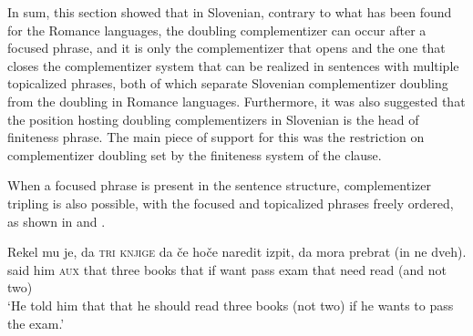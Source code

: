\documentclass[output=paper,
]{langscibook}
\begin{document}
\begin{exe} 
\ex \begin{xlist}\label{ex:plesnicar:42}

\end{xlist}
\end{exe}

\noindent In sum, this section showed that in Slovenian, contrary to what has been found for the Romance languages, the doubling complementizer can occur after a focused phrase, and it is only the complementizer that opens and the one that closes the complementizer system that can be realized in sentences with multiple topicalized phrases, both of which separate Slovenian complementizer doubling from the doubling in Romance languages. Furthermore, it was also suggested that the position hosting doubling complementizers in Slovenian is the head of finiteness phrase. The main piece of support for this was the restriction on complementizer doubling set by the finiteness system of the clause.

When a focused phrase is present in the sentence structure, complementizer tripling is also possible, with the focused and topicalized phrases freely ordered, as shown in  and .

\begin{exe} 
\ex \label{ex:plesnicar:43}
\gll Rekel	mu	je,	da	\textsc{tri} \textsc{knjige} da	če	hoče	naredit	izpit, da	mora 	prebrat (in ne dveh).\\
  said	him	\textsc{aux} that	three books	that	if	want	pass	exam that	need	read	(and not two)\\
\trans `He told him that that he should read three books (not two) if he wants to pass the exam.'
\end{exe}
\end{document}
